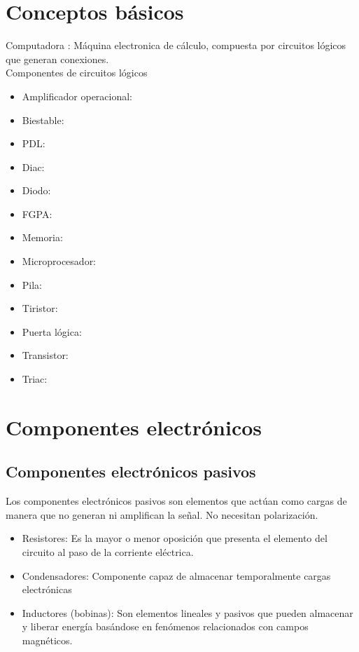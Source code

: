 \section{Conceptos b\'asicos}
Computadora : M\'aquina electronica de c\'alculo, compuesta por circuitos l\'ogicos que generan conexiones.\\

Componentes de circuitos lógicos 
\begin{itemize}
\item Amplificador operacional:
\item Biestable:
\item PDL:
\item Diac:
\item Diodo:
\item FGPA: 
\item Memoria:
\item Microprocesador:
\item Pila:
\item Tiristor:
\item Puerta l\'ogica:
\item Transistor:
\item Triac: 
\end{itemize}



\section{Componentes electr\'onicos}
\subsection{Componentes electr\'onicos pasivos}
Los componentes electr\'onicos pasivos son elementos que act\'uan como cargas de manera que no generan ni amplifican la se\~nal. No necesitan polarizaci\'on.
\begin{itemize}
\item Resistores: Es la mayor o menor oposici\'on que presenta el elemento del circuito al paso de la corriente el\'ectrica.
\item Condensadores: Componente capaz de almacenar temporalmente cargas electr\'onicas
\item Inductores (bobinas): Son elementos lineales y pasivos que pueden almacenar y liberar energ\'ia bas\'andose en fen\'omenos relacionados con campos magn\'eticos.
\end{itemize}

